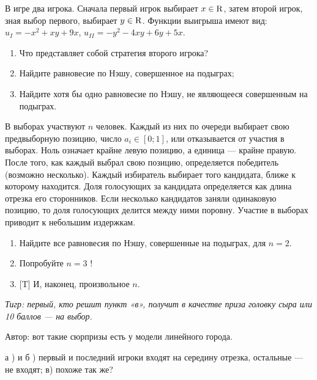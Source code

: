 \begin{problem}

В игре два игрока. Сначала первый игрок выбирает  $x\in {\rm R} $, затем второй игрок, зная выбор первого, выбирает  $y\in {\rm R} $.
Функции выигрыша имеют вид:  $u_{I} =-x^{2} +xy+9x$,  $u_{II} =-y^{2} -4xy+6y+5x$.\par
\begin{enumerate}
\item  Что представляет собой стратегия второго игрока?\par
\item Найдите равновесие по Нэшу, совершенное на подыграх;\par
\item  Найдите хотя бы одно равновесие по Нэшу, не являющееся совершенным на подыграх.\par
\end{enumerate}


\begin{sol}

\end{sol}
\end{problem}



\begin{problem}
В выборах участвуют  $n$  человек. Каждый из них по очереди выбирает свою предвыборную позицию, число  $a_{i} \in \left[0;1\right]$, или отказывается от участия в выборах. Ноль означает крайне левую позицию, а единица — крайне правую. После того, как каждый выбрал свою позицию, определяется победитель (возможно несколько). Каждый избиратель выбирает того кандидата, ближе к которому находится. Доля голосующих за кандидата определяется как длина отрезка его сторонников. Если несколько кандидатов заняли одинаковую позицию, то доля голосующих делится между ними поровну. Участие в выборах приводит к небольшим издержкам.\par
\begin{enumerate}
\item  Найдите все равновесия по Нэшу, совершенные на подыграх, для  $n=2$.\par
\item Попробуйте  $n=3$ !\par
\item  $[$T] И, наконец, произвольное  $n$.\par
\end{enumerate}
{\it Тигр: первый, кто решит пункт «в», получит в качестве приза головку сыра или 10 баллов — на выбор.}\par
Автор: вот такие сюрпризы есть у модели линейного города.\par



\begin{sol}
а )  и б ) первый и последний игроки входят на середину отрезка, остальные — не входят;
в)  похоже так же?
\end{sol}
\end{problem}



